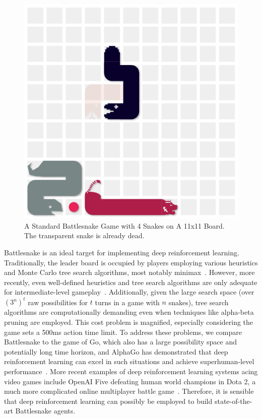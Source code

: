 \documentclass[conference]{IEEEtran}
\begin{document}
\begin{figure}
    \centering
    \includegraphics[width=\linewidth]{snake_game_screenshot.png}
    \caption{A Standard Battlesnake Game with 4 Snakes on A 11x11 Board.
        The transparent snake is already dead.
    }
    \label{fig:game}
\end{figure}

Battlesnake is an ideal target for implementing deep reinforcement learning.
Traditionally,
the leader board is occupied by players employing various heuristics and Monte
Carlo tree search algorithms,
most notably minimax~\cite{hill2018building,binnersley2020battlesnake}. However,
more recently,
even well-defined heuristics and tree search algorithms are only adequate for
intermediate-level gameplay~\cite{schier2019adversarial}. Additionally,
given the large search space (over $(3^n)^t$ raw possibilities for $t$ turns in
a game with $n$ snakes),
tree search algorithms are computationally demanding even when techniques like
alpha-beta pruning are employed. This cost problem is magnified,
especially considering the game sets a 500ms action time limit.
To address these problems, we compare Battlesnake to the game of Go,
which also has a large possibility space and potentially long time horizon,
and AlphaGo has demonstrated that deep reinforcement learning can excel in such
situations and achieve superhuman-level performance~\cite{silver2016mastering}.
More recent examples of deep reinforcement learning systems acing video games
include OpenAI Five defeating human world champions in Dota 2,
a much more complicated online multiplayer battle game~\cite{berner2019dota}.
Therefore,
it is sensible that deep reinforcement learning can possibly be employed to
build state-of-the-art Battlesnake agents.
\end{document}
